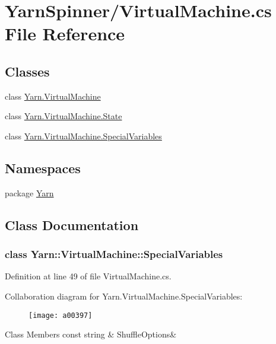 \hypertarget{a00319}{\section{Yarn\-Spinner/\-Virtual\-Machine.cs File Reference}
\label{a00319}
}
\subsection*{Classes}
\begin{DoxyCompactItemize}
\item 
class \hyperlink{a00164}{Yarn.\-Virtual\-Machine}
\item 
class \hyperlink{a00167}{Yarn.\-Virtual\-Machine.\-State}
\item 
class \hyperlink{a00164_a00384}{Yarn.\-Virtual\-Machine.\-Special\-Variables}
\end{DoxyCompactItemize}
\subsection*{Namespaces}
\begin{DoxyCompactItemize}
\item 
package \hyperlink{a00053}{Yarn}
\end{DoxyCompactItemize}


\subsection{Class Documentation}
\label{a00384}
\hypertarget{a00164_a00384}{}
\subsubsection{class Yarn\-:\-:Virtual\-Machine\-:\-:Special\-Variables}


Definition at line 49 of file Virtual\-Machine.\-cs.



Collaboration diagram for Yarn.\-Virtual\-Machine.\-Special\-Variables\-:
\nopagebreak
\begin{figure}[H]
\begin{center}
\leavevmode
\texttt{[image: a00397]}
\end{center}
\end{figure}
\begin{DoxyFields}{Class Members}
\hypertarget{a00164_aecbb8ab9becd96457d836100b2818078}{const string}\label{a00164_aecbb8ab9becd96457d836100b2818078}
&
Shuffle\-Options&
\\
\hline

\end{DoxyFields}
